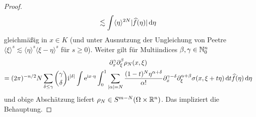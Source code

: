 \begin{proof}
\begin{align}
\lesssim \int \langle\eta\rangle^{2N} |\widehat f(\eta)|\,\mathrm d\eta
\end{align}
gleichmäßig in $x\in K$ (und unter Ausnutzung der Ungleichung von Peetre $\langle \xi\rangle^s \lesssim \langle\eta\rangle^s \langle\xi-\eta\rangle^s$ für $s\ge0$).
Weiter gilt für Multiindices $\beta,\gamma\in\mathbb N_0^n$
\begin{multline}
   \partial_x^\gamma \partial_\xi^\beta \rho_N(x,\xi) \\
   =  (2\pi)^{-n/2} N \sum_{\delta\le\gamma} \binom{\gamma}{\delta} \mathrm i^{|\delta|} \int \mathrm e^{\mathrm i x\cdot\eta} \int_0^1 \sum_{|\alpha|=N} \frac{(1-t)^N \eta^{\alpha+\delta}}{\alpha!} \partial_x^{\gamma-\delta} \partial_\xi^{\alpha+\beta} \sigma(x,\xi+t\eta) \,\mathrm d t  \widehat f(\eta) \,\mathrm d\eta 
\end{multline}
und obige Abschätzung liefert $\rho_N\in S^{m-N}(\Omega\times\mathbb R^n)$. Das impliziert die Behauptung.
\end{proof}
